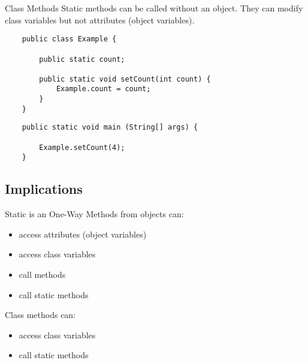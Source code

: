 \begin{frame}[fragile]{Class Methods}
    Static methods can be called without an object.
    They can modify class variables but not attributes (object variables).
    \begin{lstlisting}
    public class Example {
    
        public static count;

        public static void setCount(int count) {
            Example.count = count;
        }
    }
    \end{lstlisting}
    \begin{lstlisting}
    public static void main (String[] args) {
            
        Example.setCount(4);
    }
    \end{lstlisting}
\end{frame}

\subsection{Implications}
\begin{frame}[fragile]{Static is an One-Way}
    Methods from objects can:
    \begin{itemize}
        \item access attributes (object variables)
        \item access class variables
        \item call methods
        \item call static methods
    \end{itemize}
    Class methods can:
    \begin{itemize}
        \item access class variables
        \item call static methods
    \end{itemize}
\end{frame}



